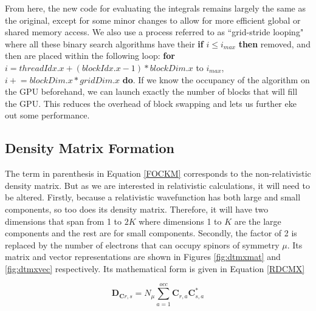 \documentclass[12pt]{report}
\begin{document}
From here, the new code for evaluating the integrals remains largely the same as the original, except for some minor changes to allow for more efficient global or shared memory access. We also use a process referred to as ``grid-stride looping" where all these binary search algorithms have their \textbf{if} $i \le i_{max}$ \textbf{then} removed, and then are placed within the following loop: \textbf{for} $i = threadIdx.x + (blockIdx.x - 1) * blockDim.x$ to $i_{max}$, $i \mathrel{+}= blockDim.x * gridDim.x$ \textbf{do}. If we know the occupancy of the algorithm on the GPU beforehand, we can launch exactly the number of blocks that will fill the GPU. This reduces the overhead of block swapping and lets us further eke out some performance.

\subsection{Density Matrix Formation}
The term in parenthesis in Equation \ref{FOCKM} corresponds to the non-relativistic density matrix. But as we are interested in relativistic calculations, it will need to be altered. Firstly, because a relativistic wavefunction has both large and small components, so too does its density matrix. Therefore, it will have two dimensions that span from 1 to $2K$ where dimensions 1 to $K$ are the large components and the rest are for small components. Secondly, the factor of 2 is replaced by the number of electrons that can occupy spinors of symmetry $\mu$. Its matrix and vector representations are shown in Figures \ref{fig:dtmxmat} and \ref{fig:dtmxvec} respectively. Its mathematical form is given in Equation \ref{RDCMX}\cite{MATSUOKA2001218}

\begin{equation}
\label{RDCMX}
\textbf{D$_{\textbf{C}r,s}$} =N_{\mu}\sum^{occ}_{a=1}\textbf{C}_{r,a}\textbf{C}^{*}_{s,a}
\end{equation}
\end{document}
